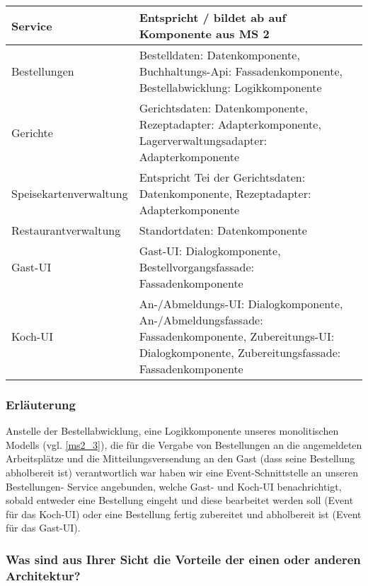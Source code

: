 \begin{tabu} to 
\hline{}
Service &Entspricht / bildet ab auf Komponente aus MS 2 \\
\hline
Bestellungen &Bestelldaten: Datenkomponente,
  Buchhaltungs-Api: Fassadenkomponente,
  Bestellabwicklung: Logikkomponente
  \\
\hline
Gerichte &Gerichtsdaten: Datenkomponente,
  Rezeptadapter: Adapterkomponente,
  Lagerverwaltungsadapter: Adapterkomponente
  \\
\hline
Speisekartenver\-waltung &Entspricht Tei der Gerichtsdaten:
  Datenkomponente, Rezeptadapter: Adapterkomponente \\
\hline
Restaurantver\-waltung &Standortdaten: Datenkomponente \\
\hline
Gast-UI &Gast-UI: Dialogkomponente,
  Bestellvorgangsfassade: Fassadenkomponente \\
\hline
Koch-UI &An-/Abmeldungs-UI: Dialogkomponente,
  An-/Abmeldungsfassade: Fassadenkomponente,
  Zubereitungs-UI: Dialogkomponente,
  Zubereitungsfassade: Fassadenkomponente
  \\
\hline
\end{tabu}

\subsubsection*{Erl\"auterung}

Anstelle der Bestellabwicklung, eine Logikkomponente
unseres monolitischen Modells (vgl. \ref{ms2_3}), die
f\"ur die Vergabe von Bestellungen an die angemeldeten
Arbeitspl\"atze und die Mitteilungsversendung an den Gast
(dass seine Bestellung abholbereit ist) verantwortlich war
haben wir eine Event-Schnittstelle an unseren Bestellungen-
Service angebunden, welche Gast- und Koch-UI
benachrichtigt, sobald entweder eine Bestellung eingeht
und diese bearbeitet werden soll (Event f\"ur das Koch-UI)
oder eine Bestellung fertig zubereitet und abholbereit ist
(Event f\"ur das Gast-UI).

\subsubsection*{Was sind aus Ihrer Sicht die Vorteile der
  einen oder anderen Architektur?}

